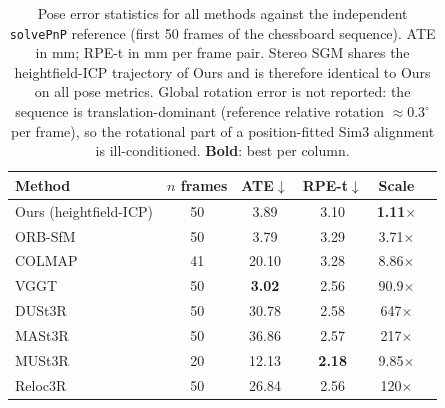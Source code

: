 \documentclass[review]{elsarticle}
\begin{document}
\begin{table}[h]
\centering
\caption{Pose error statistics for all methods against the independent \texttt{solvePnP} reference (first 50 frames of the chessboard sequence). ATE in mm; RPE-t in mm per frame pair. Stereo SGM shares the heightfield-ICP trajectory of Ours and is therefore identical to Ours on all pose metrics. Global rotation error is not reported: the sequence is translation-dominant (reference relative rotation ${\approx}0.3^{\circ}$ per frame), so the rotational part of a position-fitted Sim3 alignment is ill-conditioned. \textbf{Bold}: best per column.}
\label{tab:supp_pose_detail}
\setlength{\tabcolsep}{5pt}
\renewcommand{\arraystretch}{1.05}
\begin{tabular}{lccccc}
\toprule
Method & $n$ frames & ATE$\downarrow$ & RPE-t$\downarrow$ & Scale \\
\midrule
Ours (heightfield-ICP) & 50 & 3.89 & 3.10 & \textbf{1.11}$\times$ \\
ORB-SfM & 50 & 3.79 & 3.29 & 3.71$\times$ \\
COLMAP & 41 & 20.10 & 3.28 & 8.86$\times$ \\
VGGT & 50 & \textbf{3.02} & 2.56 & 90.9$\times$ \\
DUSt3R & 50 & 30.78 & 2.58 & 647$\times$ \\
MASt3R & 50 & 36.86 & 2.57 & 217$\times$ \\
MUSt3R & 20 & 12.13 & \textbf{2.18} & 9.85$\times$ \\
Reloc3R & 50 & 26.84 & 2.56 & 120$\times$ \\
\bottomrule
\end{tabular}
\end{table}
\end{document}
